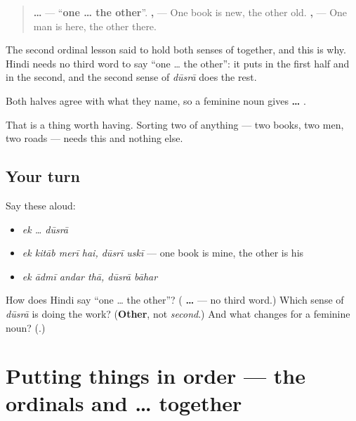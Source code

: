\begin{grammarlens}[title={Grammar Lens: one, and the other}]
\begin{quote}
\textbf{ … } — \textquotedblleft{}\textbf{one … the other}\textquotedblright{}. \textbf{   ,  } — One book is new, the other old. \textbf{   ,  } — One man is here, the other there.
\end{quote}

The second ordinal lesson said to hold both senses of \textbf{} together, and this is why. Hindi needs no third word to say \textquotedblleft{}one … the other\textquotedblright{}: it puts \textbf{} in the first half and \textbf{} in the second, and the second sense of \emph{dūsrā} does the rest.

Both halves agree with what they name, so a feminine noun gives \textbf{ … }.

That is a thing worth having. Sorting two of anything — two books, two men, two roads — needs this and nothing else.
\end{grammarlens}

\subsection*{Your turn}
Say these aloud:

\begin{itemize}
\raggedright
  \item \emph{ek … dūsrā}
  \item \emph{ek kitāb merī hai, dūsrī uskī} — one book is mine, the other is his
  \item \emph{ek ādmī andar thā, dūsrā bāhar}
\end{itemize}

\begin{tcolorbox}[breakable,colback=teal!4,colframe=teal!35!black,title={Before you move on}]
How does Hindi say \textquotedblleft{}one … the other\textquotedblright{}? (\textbf{ … } — no third word.) Which sense of \emph{dūsrā} is doing the work? (\textbf{Other}, not \emph{second}.) And what changes for a feminine noun? (\textbf{}.)
\end{tcolorbox}
\section[\texorpdfstring{\hi{पहला}, \hi{दूसरा} … (pahlā, dūsrā …)}{पहला, दूसरा … (pahlā, dūsrā …)}]{Putting things in order — the ordinals and  …  together}

